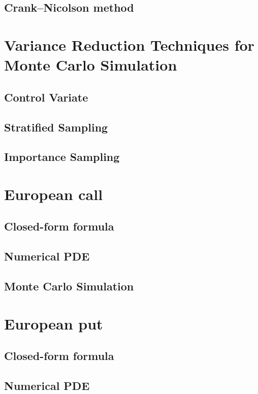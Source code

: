 \subsection{Crank–Nicolson method}
\newpage

\section{Variance Reduction Techniques for Monte Carlo Simulation}

\subsection{Control Variate}
\newpage
\subsection{Stratified Sampling}
\newpage
\subsection{Importance Sampling}
\newpage

\section{European call}

\subsection{Closed-form formula}
\newpage
\subsection{Numerical PDE}
\newpage
\subsection{Monte Carlo Simulation}
\newpage

\section{European put}

\subsection{Closed-form formula}
\newpage
\subsection{Numerical PDE}
\newpage
